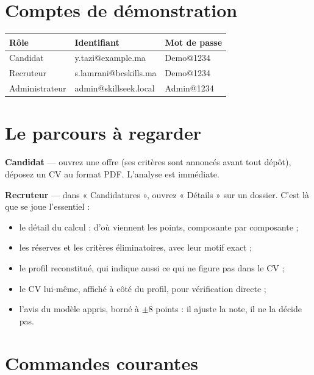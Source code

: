 \documentclass[11pt,a4paper]{article}
\begin{document}
\section{Comptes de démonstration}

\begin{center}
\begin{tabular}{@{}p{3.2cm}>{\ttfamily}p{6.2cm}>{\ttfamily}p{3.4cm}@{}}
\toprule
\textbf{Rôle} & \textrm{\textbf{Identifiant}} & \textrm{\textbf{Mot de passe}}\\
\midrule
Candidat        & y.tazi@example.ma      & Demo@1234\\
Recruteur       & s.lamrani@bcskills.ma  & Demo@1234\\
Administrateur  & admin@skillseek.local  & Admin@1234\\
\bottomrule
\end{tabular}
\end{center}

\section{Le parcours à regarder}

\textbf{Candidat} --- ouvrez une offre (ses critères sont annoncés avant
tout dépôt), déposez un CV au format PDF. L'analyse est immédiate.

\medskip
\noindent
\textbf{Recruteur} --- dans « Candidatures », ouvrez « Détails » sur un
dossier. C'est là que se joue l'essentiel :

\begin{itemize}
  \item le détail du calcul : d'où viennent les points, composante par composante ;
  \item les réserves et les critères éliminatoires, avec leur motif exact ;
  \item le profil reconstitué, qui indique aussi ce qui ne figure pas dans le CV ;
  \item le CV lui-même, affiché à côté du profil, pour vérification directe ;
  \item l'avis du modèle appris, borné à $\pm 8$ points : il ajuste la note,
        il ne la décide pas.
\end{itemize}

\section{Commandes courantes}
\end{document}
